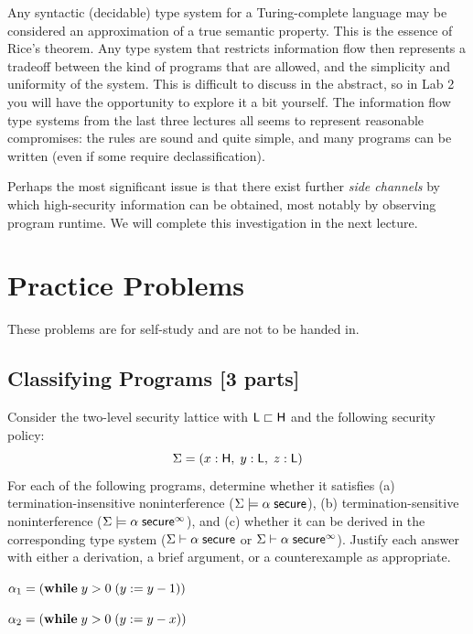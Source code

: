 \documentclass[11pt]{article}
\begin{document}
Any syntactic (decidable) type system for a Turing-complete language may be
considered an approximation of a true semantic property.  This is the essence of
Rice's theorem.  Any type system that restricts information flow then represents
a tradeoff between the kind of programs that are allowed, and the simplicity and
uniformity of the system.  This is difficult to discuss in the abstract, so in
Lab 2 you will have the opportunity to explore it a bit yourself.  The
information flow type systems from the last three lectures all seems to
represent reasonable compromises: the rules are sound and quite simple, and many
programs can be written (even if some require declassification).

Perhaps the most significant issue is that there exist further \emph{side
  channels} by which high-security information can be obtained, most notably by
observing program runtime.  We will complete this investigation in the next
lecture.

\section{Practice Problems}

These problems are for self-study and are not to be handed in.

\subsection{Classifying Programs [3 parts]}

Consider the two-level security lattice with $\mathsf{L} \sqsubset \mathsf{H}$ and
the following security policy:
\[
  \Sigma = (x : \mathsf{H},\; y : \mathsf{L},\; z : \mathsf{L})
\]
For each of the following programs, determine whether it satisfies (a)
termination-insensitive noninterference ($\Sigma \models \alpha\; \mathsf{secure}$),
(b) termination-sensitive noninterference
($\Sigma \models \alpha\; \mathsf{secure}^\infty$), and (c) whether it can be derived in the
corresponding type system ($\Sigma \vdash \alpha\; \mathsf{secure}$ or
$\Sigma \vdash \alpha\; \mathsf{secure}^\infty$).  Justify each answer with either a
derivation, a brief argument, or a counterexample as appropriate.

\begin{task}\rm
  \label{task:p1a}
  $\alpha_1 = (\mathbf{while}\; y > 0\; (y := y - 1))$
\end{task}

\begin{task}\rm
  \label{task:p1b}
  $\alpha_2 = (\mathbf{while}\; y > 0\; (y := y - x))$
\end{task}
\end{document}
